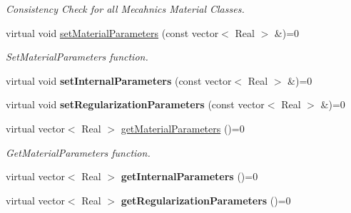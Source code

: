 \begin{DoxyCompactItemize}
\begin{DoxyCompactList}\small\item\em Consistency Check for all Mecahnics Material Classes. \item\end{DoxyCompactList}\item 
\hypertarget{classvoom_1_1_mechanics_material_ac629ead3dfd57c34e67fb4f358d8c77f}{
virtual void \hyperlink{classvoom_1_1_mechanics_material_ac629ead3dfd57c34e67fb4f358d8c77f}{setMaterialParameters} (const vector$<$ Real $>$ \&)=0}
\label{classvoom_1_1_mechanics_material_ac629ead3dfd57c34e67fb4f358d8c77f}

\begin{DoxyCompactList}\small\item\em SetMaterialParameters function. \item\end{DoxyCompactList}\item 
\hypertarget{classvoom_1_1_mechanics_material_a565e6a3d503c61cec83146829def73ee}{
virtual void {\bfseries setInternalParameters} (const vector$<$ Real $>$ \&)=0}
\label{classvoom_1_1_mechanics_material_a565e6a3d503c61cec83146829def73ee}

\item 
\hypertarget{classvoom_1_1_mechanics_material_aa8ecd6647d04fa3bf0da804908cb3115}{
virtual void {\bfseries setRegularizationParameters} (const vector$<$ Real $>$ \&)=0}
\label{classvoom_1_1_mechanics_material_aa8ecd6647d04fa3bf0da804908cb3115}

\item 
\hypertarget{classvoom_1_1_mechanics_material_ae72a81c96aa8d3dd78ab21f50cb7307e}{
virtual vector$<$ Real $>$ \hyperlink{classvoom_1_1_mechanics_material_ae72a81c96aa8d3dd78ab21f50cb7307e}{getMaterialParameters} ()=0}
\label{classvoom_1_1_mechanics_material_ae72a81c96aa8d3dd78ab21f50cb7307e}

\begin{DoxyCompactList}\small\item\em GetMaterialParameters function. \item\end{DoxyCompactList}\item 
\hypertarget{classvoom_1_1_mechanics_material_a0c40fd11403d62e451f19adc1f1ccd5c}{
virtual vector$<$ Real $>$ {\bfseries getInternalParameters} ()=0}
\label{classvoom_1_1_mechanics_material_a0c40fd11403d62e451f19adc1f1ccd5c}

\item 
\hypertarget{classvoom_1_1_mechanics_material_adf112ed5e6a2e7ebf43616a875dd38b4}{
virtual vector$<$ Real $>$ {\bfseries getRegularizationParameters} ()=0}
\label{classvoom_1_1_mechanics_material_adf112ed5e6a2e7ebf43616a875dd38b4}


\end{DoxyCompactItemize}
